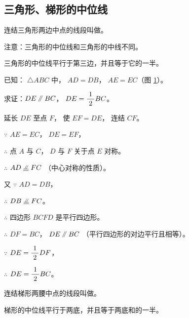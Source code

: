 \subsection{三角形、梯形的中位线}\label{subsec:czjh1-4-11}

\begin{enhancedline}

连结三角形两边中点的线段叫做。

注意：三角形的中位线和三角形的中线不同。

\begin{dingli}[三角形中位线定理]
    三角形的中位线平行于第三边，并且等于它的一半。
\end{dingli}

\begin{figure}
    \centering
    
    \caption{}\label{fig:czjh1-4-46}
\end{figure}

已知： $\triangle ABC$ 中， $AD = DB$， $AE = EC$（图 \ref{fig:czjh1-4-46}）。

求证：$DE \pingxing BC$， $DE = \dfrac{\; 1 \;}{2} BC$。

\zhengming 延长 $DE$ 至点 $F$， 使 $EF = DE$， 连结 $CF$。

$\because$ \quad $AE = EC$， $DE = EF$，

$\therefore$ \quad 点 $A$ 与 $C$， $D$ 与 $F$ 关于点 $E$ 对称。

$\therefore$ \quad $AD \pxqdy FC$ （中心对称的性质）。

又 $\because$ \quad $AD = DB$，

$\therefore$ \quad $DB \pxqdy FC$。

$\therefore$ \quad 四边形 $BCFD$ 是平行四边形。

$\therefore$ \quad $DF = BC$， $DE \pingxing BC$ （平行四边形的对边平行且相等）。

$\because$ \quad $DE = \dfrac{\; 1 \;}{2} DF$，

$\therefore$ \quad $DE = \dfrac{\; 1 \;}{2} BC$。


连结梯形两腰中点的线段叫做。

\begin{dingli}[梯形中位线定理]
    梯形的中位线平行于两底，并且等于两底和的一半。
\end{dingli}


%         
%         



\end{enhancedline}
